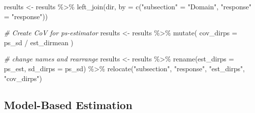 \documentclass[12pt,twoside]{reedthesis}
\newenvironment{Shaded}{\begin{snugshade}}{\end{snugshade}}
\newcommand{\AttributeTok}[1]{\textcolor[rgb]{0.77,0.63,0.00}{#1}}
\newcommand{\CommentTok}[1]{\textcolor[rgb]{0.56,0.35,0.01}{\textit{#1}}}
\newcommand{\FunctionTok}[1]{\textcolor[rgb]{0.00,0.00,0.00}{#1}}
\newcommand{\NormalTok}[1]{#1}
\newcommand{\OtherTok}[1]{\textcolor[rgb]{0.56,0.35,0.01}{#1}}
\newcommand{\SpecialCharTok}[1]{\textcolor[rgb]{0.00,0.00,0.00}{#1}}
\newcommand{\StringTok}[1]{\textcolor[rgb]{0.31,0.60,0.02}{#1}}
\begin{document}
\begin{Shaded}
\begin{Highlighting}[]
\NormalTok{results }\OtherTok{\textless{}{-}}\NormalTok{ results }\SpecialCharTok{\%\textgreater{}\%}
  \FunctionTok{left\_join}\NormalTok{(dir, }\AttributeTok{by =} \FunctionTok{c}\NormalTok{(}\StringTok{"subsection"} \OtherTok{=} \StringTok{"Domain"}\NormalTok{,}
                        \StringTok{"response"} \OtherTok{=} \StringTok{"response"}\NormalTok{))}
\end{Highlighting}
\end{Shaded}
\begin{Shaded}
\begin{Highlighting}[]
\CommentTok{\# Create CoV for ps{-}estimator}
\NormalTok{results }\OtherTok{\textless{}{-}}\NormalTok{ results }\SpecialCharTok{\%\textgreater{}\%}
  \FunctionTok{mutate}\NormalTok{(}
    \AttributeTok{cov\_dirps =}\NormalTok{ ps\_sd }\SpecialCharTok{/}\NormalTok{ est\_dirmean}
\NormalTok{  )}

\CommentTok{\# change names and rearrange }
\NormalTok{results }\OtherTok{\textless{}{-}}\NormalTok{ results }\SpecialCharTok{\%\textgreater{}\%}
  \FunctionTok{rename}\NormalTok{(}\AttributeTok{est\_dirps =}\NormalTok{ ps\_est,}
         \AttributeTok{sd\_dirps =}\NormalTok{ ps\_sd) }\SpecialCharTok{\%\textgreater{}\%}
  \FunctionTok{relocate}\NormalTok{(}\StringTok{"subsection"}\NormalTok{, }\StringTok{"response"}\NormalTok{,}
           \StringTok{"est\_dirps"}\NormalTok{, }\StringTok{"cov\_dirps"}\NormalTok{)}
\end{Highlighting}
\end{Shaded}
\hypertarget{model-based-estimation}{%
\subsection{Model-Based Estimation}\label{model-based-estimation}}
\end{document}
